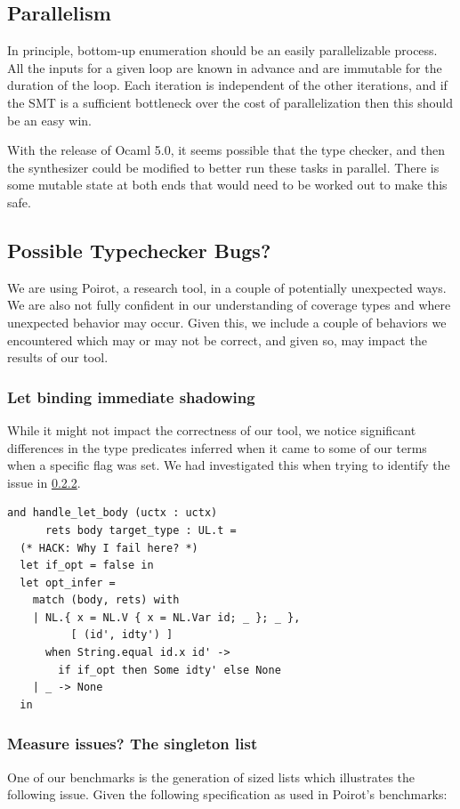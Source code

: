 \documentclass[review, sigplan]{acmart}
\begin{document}
\subsection{Parallelism}
In principle, bottom-up enumeration should be an easily parallelizable process.
All the inputs for a given loop are known in advance and are immutable for the
duration of the loop. Each iteration is independent of the other iterations, and
if the SMT is a sufficient bottleneck over the cost of parallelization then
this should be an easy win.

With the release of Ocaml 5.0, it seems possible that the type checker, and then
the synthesizer could be modified to better run these tasks in parallel. There
is some mutable state at both ends that would need to be worked out to make this safe.

\subsection{Possible Typechecker Bugs?}
We are using Poirot, a research tool, in a couple of potentially unexpected
ways. We are also not fully confident in our understanding of coverage types and
where unexpected behavior may occur. Given this, we include a couple of
behaviors we encountered which may or may not be correct, and given so, may
impact the results of our tool.

\subsubsection{Let binding immediate shadowing}

While it might not impact the correctness of our tool, we notice significant
differences in the type predicates inferred when it came to some of our terms
when a specific flag was set. We had investigated this when trying to identify
the issue in \ref{measure}.

\begin{lstlisting}[language=caml, basicstyle=\small\ttfamily]
and handle_let_body (uctx : uctx)
      rets body target_type : UL.t =
  (* HACK: Why I fail here? *)
  let if_opt = false in
  let opt_infer =
    match (body, rets) with
    | NL.{ x = NL.V { x = NL.Var id; _ }; _ },
          [ (id', idty') ]
      when String.equal id.x id' ->
        if if_opt then Some idty' else None
    | _ -> None
  in
\end{lstlisting}

\subsubsection{Measure issues? The singleton list}\label{measure}
One of our benchmarks is the generation of sized lists which illustrates the following
issue. Given the following specification as used in Poirot's benchmarks:
\end{document}
